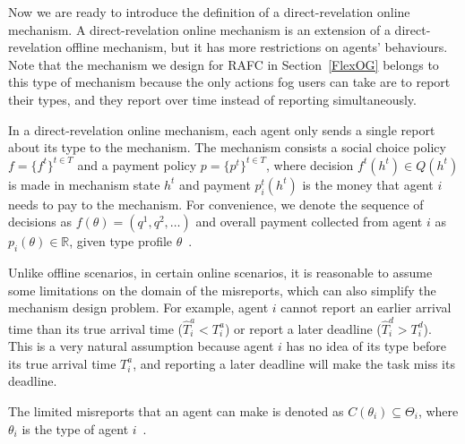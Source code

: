 \documentclass[11pt]{phdthesis}
\begin{document}
Now we are ready to introduce the definition of a direct-revelation online mechanism. A direct-revelation online mechanism is an extension of a direct-revelation offline mechanism, but it has more restrictions on agents' behaviours. Note that the mechanism we design for RAFC in Section~\ref{FlexOG} belongs to this type of mechanism because the only actions fog users can take are to report their types, and they report over time instead of reporting simultaneously. 

\begin{definition}
    In a direct-revelation online mechanism, each agent only sends a single report about its type to the mechanism. The mechanism consists a social choice policy $f =\{f^t\}^{t\in T}$ and a payment policy $p = \{p^t\}^{t\in T}$, where decision $ f^t(h^t) \in Q(h^t) $ is made in mechanism state $ h^t $ and payment $ p_i^t(h^t) $ is the money that agent $ i $ needs to pay to the mechanism. For convenience, we denote the sequence of decisions as $f(\theta) = (q^1,q^2,\ldots)$ and overall payment collected from agent $i$ as $p_i(\theta) \in \mathbb{R}$, given type profile $ \theta $~\citep[Definition 16.2]{nisan2007algorithmic}.
\end{definition}

Unlike offline scenarios, in certain online scenarios, it is reasonable to assume some limitations on the domain of the misreports, which can also simplify the mechanism design problem. For example, agent $ i $ cannot report an earlier arrival time than its true arrival time ($ \hat{T}_i^a < T_i^a $) or report a later deadline ($ \hat{T}_i^d > T_i^d$). This is a very natural assumption because agent $ i $ has no idea of its type before its true arrival time $ T_i^a $, and reporting a later deadline will make the task miss its deadline. 

\begin{definition}
    The limited misreports that an agent can make is denoted as $C(\theta_i) \subseteq \Theta_i$, where $\theta_i$ is the type of agent $i$~\citep[Definition 16.4]{nisan2007algorithmic}.
\end{definition}

%
\end{document}
